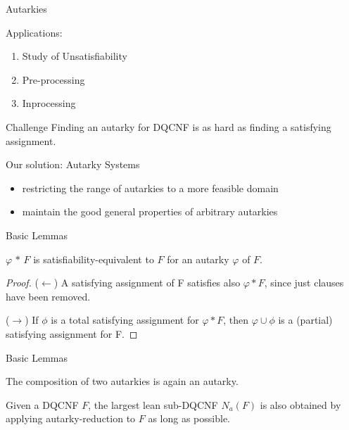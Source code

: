 \documentclass[xcolor=table	]{beamer}
\begin{document}
\begin{frame}{Autarkies}

Applications: 
\begin{enumerate}
    \item Study of Unsatisfiability
    \item Pre-processing 
    \item Inprocessing
\end{enumerate}

 \begin{exampleblock}{Challenge}
 Finding an autarky for DQCNF is as hard as finding a satisfying assignment.
\end{exampleblock}
    
  \begin{alertblock}{Our solution: Autarky Systems}
  \begin{itemize}
      \item restricting the range of autarkies to a more feasible domain
      \item maintain the good general properties of arbitrary autarkies
  \end{itemize}
 
  \end{alertblock}

\end{frame}

\begin{frame}{Basic Lemmas}
 \begin{lemma}[1]
   $\varphi$ $\ast$ $F$ is satisfiability-equivalent to $F$ for an autarky $\varphi$ of $F$.
 \end{lemma}
 \begin{proof}
 	($\leftarrow$) A satisfying assignment of F satisfies also
 	$\varphi \ast F$, since just clauses have been removed. 
 	
 	 ($\to$) If $\phi$ is a total satisfying assignment for $\varphi \ast F$, then $\varphi \cup \phi$ is a (partial) satisfying assignment for F.
 \end{proof}
\end{frame}

\begin{frame}{Basic Lemmas}
  \begin{lemma}[2]
  The composition of two autarkies is again an autarky.
 \end{lemma}
 
  \begin{lemma}[3]
   Given a DQCNF $F$, the largest lean sub-DQCNF $N_{a} (F)$ is also \newline obtained by applying autarky-reduction to $F$ as long as possible.
 \end{lemma}
 
\end{frame}
\end{document}
